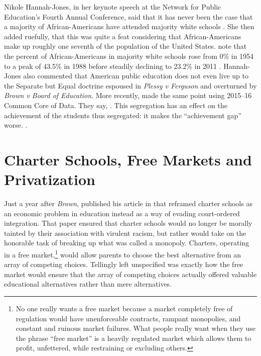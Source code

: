 Nikole Hannah-Jones, in her keynote speech at the Network for Public Education's Fourth Annual Conference, said that it has never been the case that a majority of African-Americans have attended majority white schools \parencite{Hannah-Jones2017}. She then added ruefully, that this was quite a feat considering that African-Americans make up roughly one seventh of the population of the United States. \citeauthor{Orfield.Frankenberg2014} note that the percent of African-Americans in majority white schools rose from 0\% in 1954 to a peak of 43.5\% in 1988 before steadily declining to 23.2\% in 2011 \parencite[Table 3: Percent of Black Students in Majority White Schools, 1954–2011,][10]{Orfield.Frankenberg2014}. Hannah-Jones also commented that American public education does not even live up to the Separate but Equal doctrine espoused in \textit{Plessy v Ferguson} and overturned by \textit{Brown v Board of Education}. More recently, \citeauthor{Heilig.etal2019a} made the same point using 2015--16 Common Core of Data. They say,
.
This segregation has an effect on the achievement of the students thus segregated: it makes the ``achievement gap'' worse.
.

\section{Charter Schools, Free Markets  and Privatization}\label{sec:freemarkets}\indent

Just a year after \textit{Brown},  \textcite{Friedman1955} published his article  in  \parencite{Friedman1955} that reframed charter schools as an economic problem in education instead as a way of evading court-ordered integration. That paper ensured that charter schools would no longer be morally tainted by their association with virulent racism, but rather would take on the honorable task of breaking up what was called a monopoly. Charters, operating in a free market,\footnote{No one really wants a free market because a  market completely free of regulation would have unenforceable contracts, rampant monopolies, and constant and ruinous market failures. What people really want when they use the phrase ``free market'' is a heavily regulated market which allows them to profit, unfettered, while restraining or excluding others.} would allow parents to choose the best alternative from an array of competing choices. Tellingly left unspecified was exactly how the free market would ensure that the array of competing choices actually offered valuable educational alternatives rather than mere alternatives.

